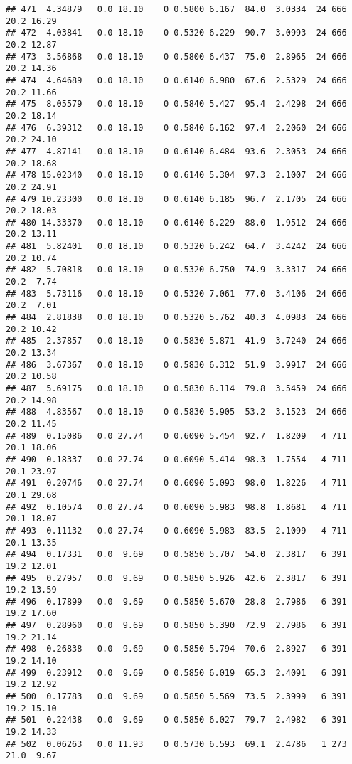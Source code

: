 \documentclass[
]{article}
\begin{document}
\begin{verbatim}
## 471  4.34879   0.0 18.10    0 0.5800 6.167  84.0  3.0334  24 666    20.2 16.29
## 472  4.03841   0.0 18.10    0 0.5320 6.229  90.7  3.0993  24 666    20.2 12.87
## 473  3.56868   0.0 18.10    0 0.5800 6.437  75.0  2.8965  24 666    20.2 14.36
## 474  4.64689   0.0 18.10    0 0.6140 6.980  67.6  2.5329  24 666    20.2 11.66
## 475  8.05579   0.0 18.10    0 0.5840 5.427  95.4  2.4298  24 666    20.2 18.14
## 476  6.39312   0.0 18.10    0 0.5840 6.162  97.4  2.2060  24 666    20.2 24.10
## 477  4.87141   0.0 18.10    0 0.6140 6.484  93.6  2.3053  24 666    20.2 18.68
## 478 15.02340   0.0 18.10    0 0.6140 5.304  97.3  2.1007  24 666    20.2 24.91
## 479 10.23300   0.0 18.10    0 0.6140 6.185  96.7  2.1705  24 666    20.2 18.03
## 480 14.33370   0.0 18.10    0 0.6140 6.229  88.0  1.9512  24 666    20.2 13.11
## 481  5.82401   0.0 18.10    0 0.5320 6.242  64.7  3.4242  24 666    20.2 10.74
## 482  5.70818   0.0 18.10    0 0.5320 6.750  74.9  3.3317  24 666    20.2  7.74
## 483  5.73116   0.0 18.10    0 0.5320 7.061  77.0  3.4106  24 666    20.2  7.01
## 484  2.81838   0.0 18.10    0 0.5320 5.762  40.3  4.0983  24 666    20.2 10.42
## 485  2.37857   0.0 18.10    0 0.5830 5.871  41.9  3.7240  24 666    20.2 13.34
## 486  3.67367   0.0 18.10    0 0.5830 6.312  51.9  3.9917  24 666    20.2 10.58
## 487  5.69175   0.0 18.10    0 0.5830 6.114  79.8  3.5459  24 666    20.2 14.98
## 488  4.83567   0.0 18.10    0 0.5830 5.905  53.2  3.1523  24 666    20.2 11.45
## 489  0.15086   0.0 27.74    0 0.6090 5.454  92.7  1.8209   4 711    20.1 18.06
## 490  0.18337   0.0 27.74    0 0.6090 5.414  98.3  1.7554   4 711    20.1 23.97
## 491  0.20746   0.0 27.74    0 0.6090 5.093  98.0  1.8226   4 711    20.1 29.68
## 492  0.10574   0.0 27.74    0 0.6090 5.983  98.8  1.8681   4 711    20.1 18.07
## 493  0.11132   0.0 27.74    0 0.6090 5.983  83.5  2.1099   4 711    20.1 13.35
## 494  0.17331   0.0  9.69    0 0.5850 5.707  54.0  2.3817   6 391    19.2 12.01
## 495  0.27957   0.0  9.69    0 0.5850 5.926  42.6  2.3817   6 391    19.2 13.59
## 496  0.17899   0.0  9.69    0 0.5850 5.670  28.8  2.7986   6 391    19.2 17.60
## 497  0.28960   0.0  9.69    0 0.5850 5.390  72.9  2.7986   6 391    19.2 21.14
## 498  0.26838   0.0  9.69    0 0.5850 5.794  70.6  2.8927   6 391    19.2 14.10
## 499  0.23912   0.0  9.69    0 0.5850 6.019  65.3  2.4091   6 391    19.2 12.92
## 500  0.17783   0.0  9.69    0 0.5850 5.569  73.5  2.3999   6 391    19.2 15.10
## 501  0.22438   0.0  9.69    0 0.5850 6.027  79.7  2.4982   6 391    19.2 14.33
## 502  0.06263   0.0 11.93    0 0.5730 6.593  69.1  2.4786   1 273    21.0  9.67

\end{verbatim}
\end{document}
